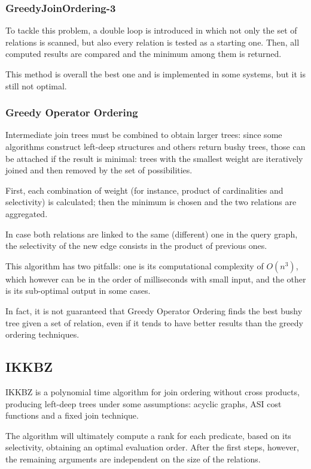 \subsubsection{GreedyJoinOrdering-3}
To tackle this problem, a double loop is introduced in which not only the set of relations is scanned, but also every relation is tested as a starting one. Then, all computed results are compared and the minimum among them is returned. 

This method is overall the best one and is implemented in some systems, but it is still not optimal.

\subsubsection{Greedy Operator Ordering}
Intermediate join trees must be combined to obtain larger trees: since some algorithms construct left-deep structures and others return bushy trees, those can be attached if the result is minimal: trees with the smallest weight are iteratively joined and then removed by the set of possibilities. 

First, each combination of weight (for instance, product of cardinalities and selectivity) is calculated; then the minimum is chosen and the two relations are aggregated. 

In case both relations are linked to the same (different) one in the query graph, the selectivity of the new edge consists in the product of previous ones. 

This algorithm has two pitfalls: one is its computational complexity of $O(n^3)$, which however can be in the order of milliseconds with small input, and the other is its sub-optimal output in some cases.

In fact, it is not guaranteed that Greedy Operator Ordering finds the best bushy tree given a set of relation, even if it tends to have better results than the greedy ordering techniques.

\subsection{IKKBZ}
IKKBZ is a polynomial time algorithm for join ordering without cross products, producing left-deep trees under some assumptions: acyclic graphs, ASI cost functions and a fixed join technique.

The algorithm will ultimately compute a rank for each predicate, based on its selectivity, obtaining an optimal evaluation order. After the first steps, however, the remaining arguments are independent on the size of the relations.

